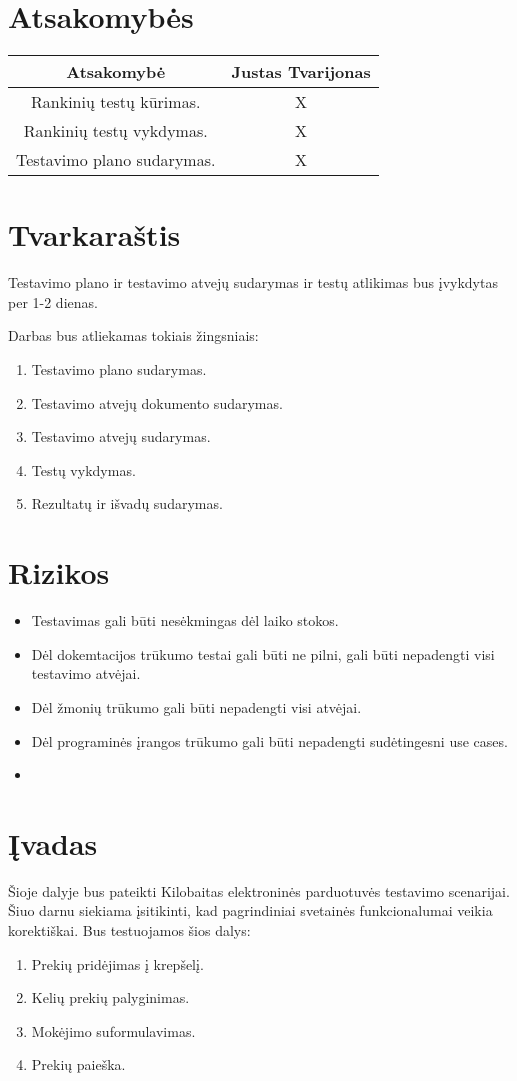 \documentclass{VUMIFPSkursinis}
\begin{document}
\section{Atsakomybės}
\begin{center}
\begin{tabular}{ |c|c| } 
 \hline
 Atsakomybė & Justas Tvarijonas \\ \hline
 Rankinių testų kūrimas. & X \\ \hline
 Rankinių testų vykdymas. & X \\ \hline
 Testavimo plano sudarymas. & X \\ \hline
\end{tabular}
\end{center}
\vspace{1cm}
\section{Tvarkaraštis}
Testavimo plano ir testavimo atvejų sudarymas ir testų atlikimas bus įvykdytas per 1-2 dienas.\newline

Darbas bus atliekamas tokiais žingsniais:
\begin{enumerate}
	\item{Testavimo plano sudarymas.}
	\item{Testavimo atvejų dokumento sudarymas.}
	\item{Testavimo atvejų sudarymas.}
	\item{Testų vykdymas.}
	\item{Rezultatų ir išvadų sudarymas.}
\end{enumerate}
\vspace{1cm}
\section{Rizikos}
\begin{itemize}
	\item Testavimas gali būti nesėkmingas dėl laiko stokos.
	\item Dėl dokemtacijos trūkumo testai gali būti ne pilni, gali būti nepadengti visi testavimo atvėjai.
	\item Dėl žmonių trūkumo gali būti nepadengti visi atvėjai.
	\item Dėl programinės įrangos trūkumo gali būti nepadengti sudėtingesni use cases.
	\item 
\end{itemize}
\section{Įvadas}
Šioje dalyje bus pateikti Kilobaitas elektroninės parduotuvės testavimo scenarijai. Šiuo darnu siekiama įsitikinti, kad pagrindiniai svetainės funkcionalumai veikia korektiškai. Bus testuojamos šios dalys:
\begin{enumerate}
	\item Prekių pridėjimas į krepšelį.
	\item Kelių prekių palyginimas.
	\item Mokėjimo suformulavimas.
	\item Prekių paieška.
\end{enumerate}
\end{document}
